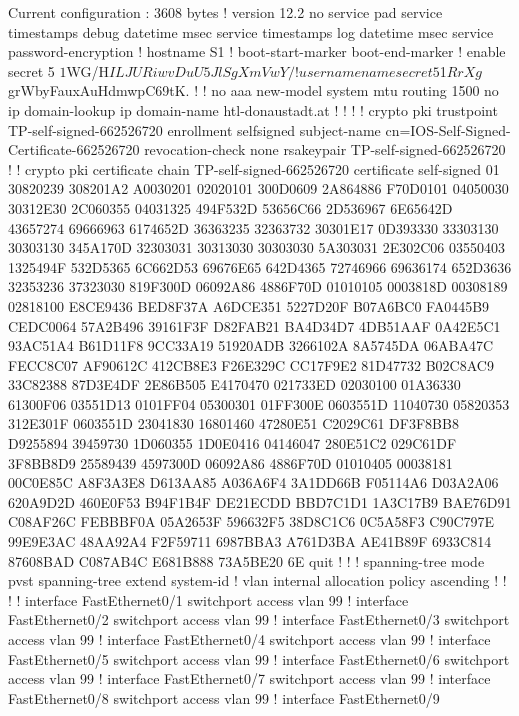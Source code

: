 \documentclass[a4paper]{article}
\begin{document}
Current configuration : 3608 bytes
!
version 12.2
no service pad
service timestamps debug datetime msec
service timestamps log datetime msec
service password-encryption
!
hostname S1
!
boot-start-marker
boot-end-marker
!
enable secret 5 $1$WG/H$ILJURiwvDuU5JlSgXmVwY/
!
username name secret 5 $1$RrXg$grWbyFauxAuHdmwpC69tK.
!
!
no aaa new-model
system mtu routing 1500
no ip domain-lookup
ip domain-name htl-donaustadt.at
!
!
!
!
crypto pki trustpoint TP-self-signed-662526720
 enrollment selfsigned
 subject-name cn=IOS-Self-Signed-Certificate-662526720
 revocation-check none
 rsakeypair TP-self-signed-662526720
!
!
crypto pki certificate chain TP-self-signed-662526720
 certificate self-signed 01
  30820239 308201A2 A0030201 02020101 300D0609 2A864886 F70D0101 04050030
  30312E30 2C060355 04031325 494F532D 53656C66 2D536967 6E65642D 43657274
  69666963 6174652D 36363235 32363732 30301E17 0D393330 33303130 30303130
  345A170D 32303031 30313030 30303030 5A303031 2E302C06 03550403 1325494F
  532D5365 6C662D53 69676E65 642D4365 72746966 69636174 652D3636 32353236
  37323030 819F300D 06092A86 4886F70D 01010105 0003818D 00308189 02818100
  E8CE9436 BED8F37A A6DCE351 5227D20F B07A6BC0 FA0445B9 CEDC0064 57A2B496
  39161F3F D82FAB21 BA4D34D7 4DB51AAF 0A42E5C1 93AC51A4 B61D11F8 9CC33A19
  51920ADB 3266102A 8A5745DA 06ABA47C FECC8C07 AF90612C 412CB8E3 F26E329C
  CC17F9E2 81D47732 B02C8AC9 33C82388 87D3E4DF 2E86B505 E4170470 021733ED
  02030100 01A36330 61300F06 03551D13 0101FF04 05300301 01FF300E 0603551D
  11040730 05820353 312E301F 0603551D 23041830 16801460 47280E51 C2029C61
  DF3F8BB8 D9255894 39459730 1D060355 1D0E0416 04146047 280E51C2 029C61DF
  3F8BB8D9 25589439 4597300D 06092A86 4886F70D 01010405 00038181 00C0E85C
  A8F3A3E8 D613AA85 A036A6F4 3A1DD66B F05114A6 D03A2A06 620A9D2D 460E0F53
  B94F1B4F DE21ECDD BBD7C1D1 1A3C17B9 BAE76D91 C08AF26C FEBBBF0A 05A2653F
  596632F5 38D8C1C6 0C5A58F3 C90C797E 99E9E3AC 48AA92A4 F2F59711 6987BBA3
  A761D3BA AE41B89F 6933C814 87608BAD C087AB4C E681B888 73A5BE20 6E
  quit
!
!
!
spanning-tree mode pvst
spanning-tree extend system-id
!
vlan internal allocation policy ascending
!
!
!
!
interface FastEthernet0/1
 switchport access vlan 99
!
interface FastEthernet0/2
 switchport access vlan 99
!
interface FastEthernet0/3
 switchport access vlan 99
!
interface FastEthernet0/4
 switchport access vlan 99
!
interface FastEthernet0/5
 switchport access vlan 99
!
interface FastEthernet0/6
 switchport access vlan 99
!
interface FastEthernet0/7
 switchport access vlan 99
!
interface FastEthernet0/8
 switchport access vlan 99
!
interface FastEthernet0/9
\end{document}

